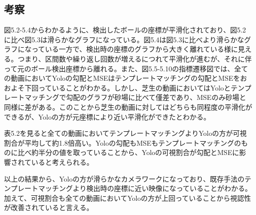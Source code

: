 \documentclass[11pt,a4j]{jreport}
\begin{document}


\subsection{考察}

図5.2-5.4からわかるように、検出したボールの座標が平滑化されており、図5.2に比べ図5.3は滑らかなグラフになっている。図5.4は図5.3に比べより滑らかなグラフになっている一方で、検出時の座標のグラフから大きく離れている様に見える。つまり、区間数や繰り返し回数が増えるにつれて平滑化が進むが、それに伴って元のボール検出座標から離れる。また、図5.5-5.10の指標遷移図では、全ての動画においてYoloの勾配とMSEはテンプレートマッチングの勾配とMSEをおおよそ下回っていることがわかる。しかし、芝生の動画においてはYoloとテンプレートマッチングで勾配のグラフが砂場に比べて僅差であり、MSEのみ砂場と同様に差がある。このことから芝生の動画に対してはどちらも同程度の平滑化ができるが、Yoloの方が元座標により近い平滑化ができたとわかる。

表5.2を見ると全ての動画においてテンプレートマッチングよりYoloの方が可視割合が平均して約1.8倍高い。Yoloの勾配もMSEもテンプレートマッチングのものに比べ約半分の値を取っていることから、Yoloの可視割合が勾配とMSEに影響されていると考えられる。

以上の結果から、Yoloの方が滑らかなカメラワークになっており、既存手法のテンプレートマッチングより検出時の座標に近い映像になっていることがわかる。加えて、可視割合も全ての動画においてYoloの方が上回っていることから視認性が改善されていると言える。
\end{document}
